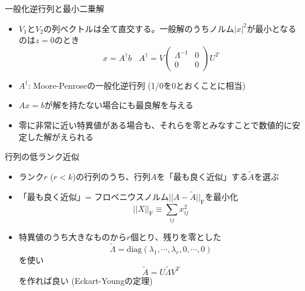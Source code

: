 \documentclass[dvipdfmx]{beamer}
\begin{document}
\begin{frame}[t,fragile]{一般化逆行列と最小二乗解}
  \begin{itemize}
    \setlength{\itemsep}{1em}
  \item $V_1$と$V_2$の列ベクトルは全て直交する。一般解のうちノルム$|x|^2$が最小となるのは$z=0$のとき
    \[
    x = A^\dagger b \ \ \ \ A^\dagger = V \begin{pmatrix} \Lambda^{-1} & 0 \\ 0 & 0 \end{pmatrix} U^T
    \]
  \item $A^\dagger$: Moore-Penroseの一般化逆行列 (1/0を0とおくことに相当)
  \item $Ax=b$が解を持たない場合にも最良解を与える
  \item 零に非常に近い特異値がある場合も、それらを零とみなすことで数値的に安定した解がえられる
  \end{itemize}
\end{frame}

\begin{frame}[t,fragile]{行列の低ランク近似}
  \begin{itemize}
  \item ランク$r$ ($r<k$)の行列のうち、行列$A$を「最も良く近似」する$\tilde{A}$を選ぶ
  \item 「最も良く近似」= フロベニウスノルム$||A-\tilde{A}||_\mathrm{F}$を最小化
    \[
    ||X||_\mathrm{F} \equiv \sum_{ij} x_{ij}^2
    \]
  \item 特異値のうち大きなものから$r$個とり、残りを零とした
    \[
    \tilde{\Lambda} = \text{diag}(\lambda_1,\cdots,\lambda_r,0,\cdots,0)
    \]
    を使い
    \[
    \tilde{A} = U \tilde{\Lambda} V^T
    \]
    を作れば良い (Eckart-Youngの定理)
  \end{itemize}
\end{frame}
\end{document}
